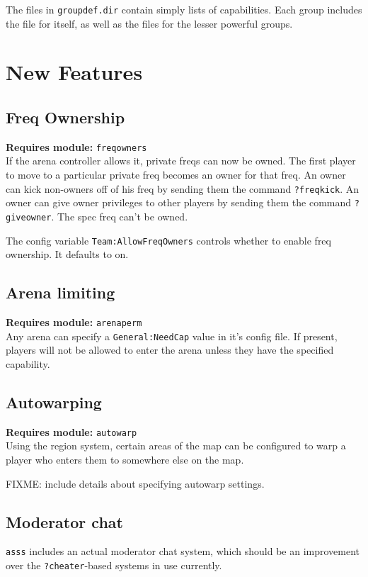 \documentclass{article}
\newcommand{\requiremod}[1]{\noindent\textbf{Requires module:} \texttt{#1}\\}
\newcommand{\asss}{\texttt{asss}}
\begin{document}
The files in \verb/groupdef.dir/ contain simply lists of capabilities.
Each group includes the file for itself, as well as the files for the
lesser powerful groups.


\section{New Features}

\subsection{Freq Ownership}

\requiremod{freqowners}
If the arena controller allows it, private freqs can now be owned. The
first player to move to a particular private freq becomes an owner for
that freq. An owner can kick non-owners off of his freq by sending them
the command \verb/?freqkick/. An owner can give owner privileges to
other players by sending them the command \verb/?giveowner/. The spec
freq can't be owned.

The config variable \texttt{Team:AllowFreqOwners} controls whether to
enable freq ownership. It defaults to on.

\subsection{Arena limiting}

\requiremod{arenaperm}
Any arena can specify a \texttt{General:NeedCap} value in it's config
file. If present, players will not be allowed to enter the arena unless
they have the specified capability.


\subsection{Autowarping}

\requiremod{autowarp}
Using the region system, certain areas of the map can be configured to
warp a player who enters them to somewhere else on the map.

FIXME: include details about specifying autowarp settings.


\subsection{Moderator chat}

\asss{} includes an actual moderator chat system, which should be an
improvement over the \verb/?cheater/-based systems in use currently.
\end{document}
